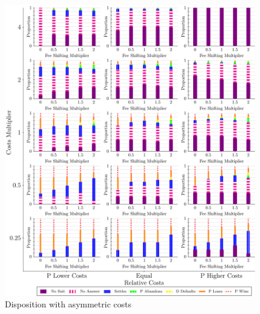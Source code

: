 \documentclass{article}
\begin{document}
\begin{figure}
    \centering
    \begin{minipage}{0.48\textwidth}
        \centering
        \includegraphics[width=0.98\textwidth, scale=0.70, trim={0in 0in 0in 0in}, clip]{../Figures/Disposition Varying Relative Costs} %
        \caption{Disposition with asymmetric costs}
		\label{fig:dispositions_costsasymmetry}
    \end{minipage}\hfill
    \begin{minipage}{0.48\textwidth}
        \centering

\end{minipage}
\end{figure}
\end{document}
